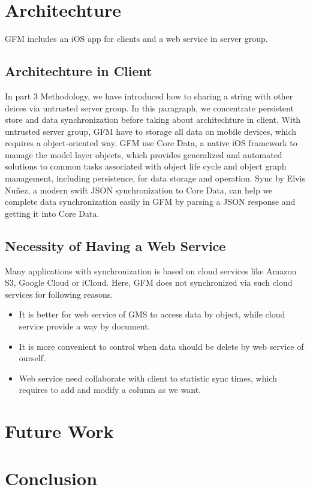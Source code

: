 \documentclass[twocolumn,10pt]{article}
\begin{document}
\section{Architechture}
GFM includes an iOS app for clients and a web service in server group.

\subsection{Architechture in Client}
In part 3 Methodology, we have introduced how to sharing a string with other deices via untrusted server group. In this paragraph, we concentrate persistent store and data synchronization before taking about architechture in client. With untrusted server group, GFM have to storage all data on mobile devices, which requires a object-oriented way. GFM use Core Data\cite{coredata}, a native iOS framework to manage the model layer objects, which provides generalized and automated solutions to common tasks associated with object life cycle and object graph management, including persistence, for data storage and operation. Sync\cite{sync} by Elvis Nuñez, a modern swift JSON synchronization to Core Data, can help we complete data synchronization easily in GFM by parsing a JSON response and getting it into Core Data.
\subsection{Necessity of Having a Web Service}
Many applications with synchronization is based on cloud services like Amazon S3, Google Cloud or iCloud. Here, GFM does not synchronized via such cloud services for following reasons.
\begin{itemize}
\setlength{\itemsep}{1pt}
\setlength{\parskip}{0pt}
\setlength{\parsep}{0pt}
    \item It is better for web service of GMS to access data by object, while cloud service provide a way by document. 
    \item It is more convenient to control when data should be delete by web service of ourself.
    \item Web service need collaborate with client to statistic sync times, which requires to add and modify a column as we want.
\end{itemize}

\section{Future Work}
\section{Conclusion}

{\tiny
\printbibliography
}
\end{document}
